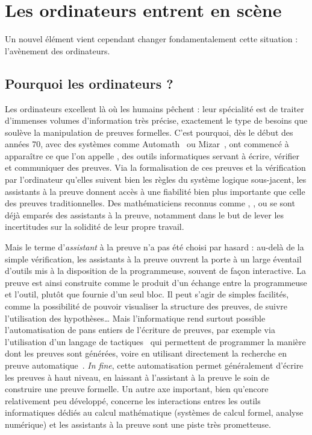 \section{Les ordinateurs entrent en scène}
\label{sec:assistants-preuve}

Un nouvel élément vient cependant changer fondamentalement cette situation :
l’avènement des ordinateurs.

\subsection{Pourquoi les ordinateurs ?}

Les ordinateurs excellent là où les humains pêchent : leur spécialité est de traiter
d’immenses volumes d’information très précise, exactement le type
de besoins que soulève la manipulation de preuves formelles. C’est pourquoi, dès
le début des années 70, avec des systèmes comme Automath~
ou Mizar~, 
ont commencé à apparaître ce que l’on appelle , des outils informatiques servant à écrire, vérifier et communiquer des
preuves.
Via la formalisation de ces preuves et la vérification par l’ordinateur qu’elles
suivent bien les règles du système logique sous-jacent, les assistants à la preuve
donnent accès à une fiabilité bien plus importante que celle des preuves
traditionnelles. Des mathématiciens reconnus comme
,
,
ou 
se sont déjà emparés des assistants à la preuve,
notamment dans le but de lever les incertitudes
sur la solidité de leur propre travail.

Mais le terme d’\emph{assistant} à la preuve n’a pas été choisi par hasard : au-delà
de la simple vérification, les assistants à la preuve ouvrent la porte à un large
éventail d’outils mis à la disposition de la programmeuse, souvent de façon
interactive. La preuve est ainsi construite comme le produit d’un échange entre 
la programmeuse et l’outil, plutôt que fournie d’un seul bloc.
Il peut s’agir de simples
facilités, comme la possibilité de pouvoir visualiser la structure des
preuves, de suivre l’utilisation des hypothèses…
Mais l’informatique rend surtout possible l’automatisation de pans entiers
de l’écriture de preuves,
par exemple via l’utilisation d’un langage de tactiques~
qui permettent de programmer la manière dont les preuves sont
générées, voire en utilisant directement la recherche en
preuve automatique~.
\textit{In fine}, cette automatisation permet généralement d’écrire
les preuves à haut niveau, en laissant à l’assistant à la preuve le soin
de construire une preuve formelle.
Un autre axe important, bien qu’encore relativement peu développé, concerne
les interactions entres les outils informatiques dédiés au calcul mathématique
(systèmes de calcul formel, analyse numérique) et les assistants à la
preuve sont une piste très prometteuse.

